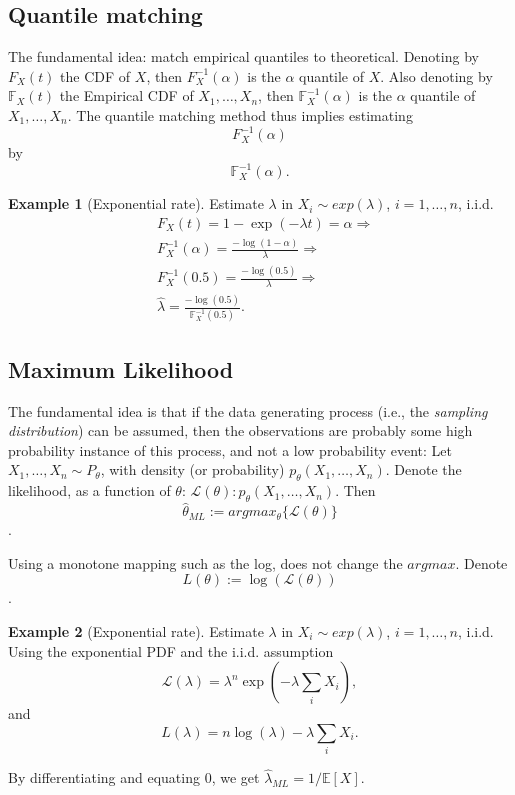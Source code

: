 \documentclass[12pt,a4paper]{article}
\theoremstyle{plain}
\theoremstyle{definition}
\newtheorem{example}{Example}
\newcommand{\expectn}[1]{\mathbb{E}[#1]}
\newcommand{\cdf}[2]{F_{#1}(#2)}
\newcommand{\cdfn}[2]{\mathbb{F}_{#1}(#2)}
\newcommand{\icdf}[2]{F^{-1}_{#1}(#2)}
\newcommand{\icdfn}[2]{\mathbb{F}^{-1}_{#1}(#2)}
\newcommand{\lik}{\mathcal{L}}
\newcommand{\loglik}{L}
\begin{document}
\subsection{Quantile matching}
\label{sec:quantiles}
The fundamental idea: match empirical quantiles to theoretical. 
Denoting by $\cdf{X}{t}$ the CDF of $X$, then $\icdf{X}{\alpha}$ is the $\alpha$ quantile of $X$.
Also denoting by $\cdfn{X}{t}$ the Empirical CDF of $X_1,\dots, X_n$, then $\icdfn{X}{\alpha}$ is the $\alpha$ quantile of $X_1,\dots, X_n$.
The quantile matching method thus implies estimating
$$ \icdf{X}{\alpha}   $$
by 
$$ \icdfn{X}{\alpha}  . $$

\begin{example}[Exponential rate]
Estimate $\lambda$ in $X_i \sim exp(\lambda)$, $i=1,\dots,n$, i.i.d.
\begin{align*}
	& \cdf{X}{t} = 1-\exp(-\lambda t) = \alpha \Rightarrow \\
	& \icdf{X}{\alpha} = \frac{-\log(1-\alpha)}{\lambda} \Rightarrow \\
	& \icdf{X}{0.5} = \frac{-\log(0.5)}{\lambda} \Rightarrow \\
	& \hat{\lambda} = \frac{-\log(0.5)}{\icdfn{X}{0.5}}.
\end{align*}

\end{example}


\subsection{Maximum Likelihood}
\label{sec:ml}

The fundamental idea is that if the data generating process (i.e., the \emph{sampling distribution}) can be assumed, then the observations are probably some high probability instance of this process, and not a low probability event:
Let $X_1,\dots,X_n \sim P_\theta$, with density (or probability) $p_\theta(X_1,\dots,X_n)$.
Denote the likelihood, as a function of $\theta$: $\lik(\theta): p_\theta(X_1,\dots,X_n)$.
Then $$\hat{\theta}_{ML}:= argmax_{\theta}\{ \lik(\theta) \}$$.

Using a monotone mapping such as the log, does not change the $argmax$. 
Denote $$\loglik(\theta):=\log(\lik(\theta))$$.

 
\begin{example}[Exponential rate]

Estimate $\lambda$ in $X_i \sim exp(\lambda)$, $i=1,\dots,n$, i.i.d.
Using the exponential PDF and the i.i.d. assumption
$$ \lik(\lambda) = \lambda^n \exp(-\lambda \sum_i X_i), $$
and 
$$ \loglik(\lambda) = n \log(\lambda) -\lambda \sum_i X_i. $$

By differentiating and equating $0$, we get $\hat{\lambda}_{ML}=1/\expectn{X}$.

\end{example}
\end{document}
